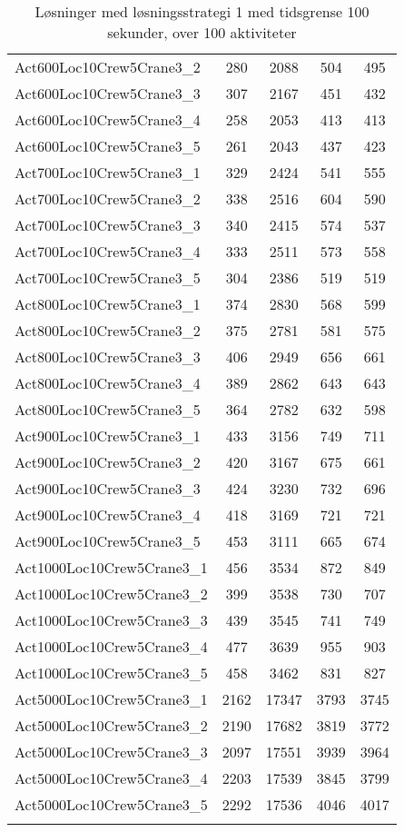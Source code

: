 \begin{center}
\begin{longtable}{ | l | c | c | c | c | }
Act600Loc10Crew5Crane3\_2	&	280	&	2088	&	504	&	495	\\
Act600Loc10Crew5Crane3\_3	&	307	&	2167	&	451	&	432	\\
Act600Loc10Crew5Crane3\_4	&	258	&	2053	&	413	&	413	\\
Act600Loc10Crew5Crane3\_5	&	261	&	2043	&	437	&	423	\\
Act700Loc10Crew5Crane3\_1	&	329	&	2424	&	541	&	555	\\
Act700Loc10Crew5Crane3\_2	&	338	&	2516	&	604	&	590	\\
Act700Loc10Crew5Crane3\_3	&	340	&	2415	&	574	&	537	\\
Act700Loc10Crew5Crane3\_4	&	333	&	2511	&	573	&	558	\\
Act700Loc10Crew5Crane3\_5	&	304	&	2386	&	519	&	519	\\
Act800Loc10Crew5Crane3\_1	&	374	&	2830	&	568	&	599	\\
Act800Loc10Crew5Crane3\_2	&	375	&	2781	&	581	&	575	\\
Act800Loc10Crew5Crane3\_3	&	406	&	2949	&	656	&	661	\\
Act800Loc10Crew5Crane3\_4	&	389	&	2862	&	643	&	643	\\
Act800Loc10Crew5Crane3\_5	&	364	&	2782	&	632	&	598	\\
Act900Loc10Crew5Crane3\_1	&	433	&	3156	&	749	&	711	\\
Act900Loc10Crew5Crane3\_2	&	420	&	3167	&	675	&	661	\\
Act900Loc10Crew5Crane3\_3	&	424	&	3230	&	732	&	696	\\
Act900Loc10Crew5Crane3\_4	&	418	&	3169	&	721	&	721	\\
Act900Loc10Crew5Crane3\_5	&	453	&	3111	&	665	&	674	\\
Act1000Loc10Crew5Crane3\_1	&	456	&	3534	&	872	&	849	\\
Act1000Loc10Crew5Crane3\_2	&	399	&	3538	&	730	&	707	\\
Act1000Loc10Crew5Crane3\_3	&	439	&	3545	&	741	&	749	\\
Act1000Loc10Crew5Crane3\_4	&	477	&	3639	&	955	&	903	\\
Act1000Loc10Crew5Crane3\_5	&	458	&	3462	&	831	&	827	\\
Act5000Loc10Crew5Crane3\_1	&	2162	&	17347	&	3793	&	3745	\\
Act5000Loc10Crew5Crane3\_2	&	2190	&	17682	&	3819	&	3772	\\
Act5000Loc10Crew5Crane3\_3	&	2097	&	17551	&	3939	&	3964	\\
Act5000Loc10Crew5Crane3\_4	&	2203	&	17539	&	3845	&	3799	\\
Act5000Loc10Crew5Crane3\_5	&	2292	&	17536	&	4046	&	4017	\\
\hline				
\caption{Løsninger med løsningsstrategi 1 med tidsgrense 100 sekunder, over 100 aktiviteter}															
\label{tab:solutionAssignAltRFSTF100s}					
\end{longtable}									
\end{center}

